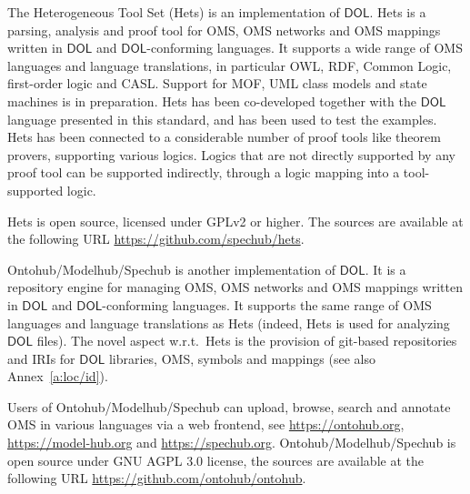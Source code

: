 \documentclass[10pt, a4paper]{isov2}
\newcommand*{\DOL}{\ensuremath{\mathsf{DOL}}\xspace}
\begin{document}
\label{a:hets} The
Heterogeneous Tool Set (Hets) is  an implementation  of
\DOL. Hets is a parsing, analysis and proof tool
for OMS, OMS networks and OMS mappings written in \DOL and
\DOL-conforming languages.  It supports a wide range of OMS languages
and language translations, in particular OWL, RDF, Common Logic,
first-order logic and CASL. Support for MOF, UML class models and
state machines is in preparation.  Hets has been co-developed together
with the \DOL language presented in this standard, and has been used to
test the examples. Hets has been connected to a considerable number of
proof tools like theorem provers, supporting various logics. Logics
that are not directly supported by any proof tool can be supported
indirectly, through a logic mapping into a tool-supported logic.

Hets  is open source, licensed under GPLv2 or higher. The sources are
available at the following URL \url{https://github.com/spechub/hets}.


\label{a:ontohub}


Ontohub/Modelhub/Spechub is  another implementation  of
\DOL. It is a repository engine for managing OMS, OMS networks and OMS
mappings written in \DOL and \DOL-conforming languages.  It supports the
same range of OMS languages and language translations as Hets (indeed,
Hets is used for analyzing \DOL files). The novel aspect w.r.t.\ Hets
is the provision of git-based repositories and IRIs for \DOL libraries,
OMS, symbols and mappings (see also Annex~\ref{a:loc/id}).

Users of Ontohub/Modelhub/Spechub can upload, browse, search and annotate 
OMS in various languages via a web frontend, 
see \url{https://ontohub.org}, \url{https://model-hub.org} and \url{https://spechub.org}.
Ontohub/Modelhub/Spechub is open source under GNU AGPL 3.0 license,  the sources are available at the following URL 
\url{https://github.com/ontohub/ontohub}.
\end{document}
